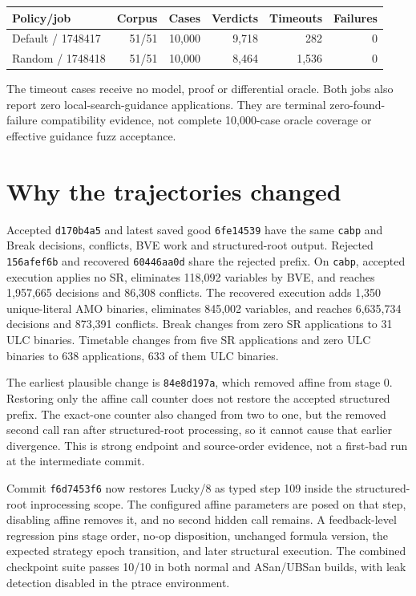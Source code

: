 \documentclass[11pt]{article}
\begin{document}
\begin{center}
\begin{tabular}{@{}lrrrrr@{}}
\toprule
Policy/job & Corpus & Cases & Verdicts & Timeouts & Failures \\
\midrule
Default / 1748417 & 51/51 & 10,000 & 9,718 & 282 & 0 \\
Random / 1748418 & 51/51 & 10,000 & 8,464 & 1,536 & 0 \\
\bottomrule
\end{tabular}
\end{center}

The timeout cases receive no model, proof or differential oracle. Both jobs
also report zero local-search-guidance applications. They are terminal
zero-found-failure compatibility evidence, not complete 10,000-case oracle
coverage or effective guidance fuzz acceptance.

\section*{Why the trajectories changed}

Accepted \texttt{d170b4a5} and latest saved good \texttt{6fe14539} have the
same \texttt{cabp} and Break decisions, conflicts, BVE work and structured-root
output. Rejected \texttt{156afef6b} and recovered \texttt{60446aa0d} share the
rejected prefix. On \texttt{cabp}, accepted execution applies no SR, eliminates
118,092 variables by BVE, and reaches 1,957,665 decisions and 86,308 conflicts.
The recovered execution adds 1,350 unique-literal AMO binaries, eliminates
845,002 variables, and reaches 6,635,734 decisions and 873,391 conflicts. Break
changes from zero SR applications to 31 ULC binaries. Timetable changes from
five SR applications and zero ULC binaries to 638 applications, 633 of them ULC
binaries.

The earliest plausible change is \texttt{84e8d197a}, which removed affine from
stage 0. Restoring only the affine call counter does not restore the accepted
structured prefix. The exact-one counter also changed from two to one, but the
removed second call ran after structured-root processing, so it cannot cause
that earlier divergence. This is strong endpoint and source-order evidence,
not a first-bad run at the intermediate commit.

Commit \texttt{f6d7453f6} now restores Lucky/8 as typed step 109 inside the
structured-root inprocessing scope. The configured affine parameters are posed
on that step, disabling affine removes it, and no second hidden call remains.
A feedback-level regression pins stage order, no-op disposition, unchanged
formula version, the expected strategy epoch transition, and later structural
execution. The combined checkpoint suite passes 10/10 in both normal and
ASan/UBSan builds, with leak detection disabled in the ptrace environment.
\end{document}
